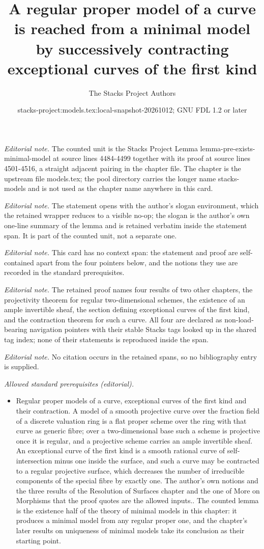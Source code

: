 \documentclass[10pt,a4paper]{amsart}
\title{A regular proper model of a curve is reached from a minimal model by successively contracting exceptional curves of the first kind}
\author{The Stacks Project Authors}
\date{stacks-project:models.tex:local-snapshot-20261012; GNU FDL 1.2 or later}
\theoremstyle{plain}
\theoremstyle{definition}
\theoremstyle{remark}
\numberwithin{equation}{subsection}
\begin{document}
\maketitle
\noindent\textit{Editorial note.} The counted unit is the Stacks Project Lemma lemma-pre-exists-minimal-model at source lines 4484-4499 together with its proof at source lines 4501-4516, a straight adjacent pairing in the chapter file. The chapter is the upstream file models.tex; the pool directory carries the longer name stacks-models and is not used as the chapter name anywhere in this card.\par\medskip
\noindent\textit{Editorial note.} The statement opens with the author's slogan environment, which the retained wrapper reduces to a visible no-op; the slogan is the author's own one-line summary of the lemma and is retained verbatim inside the statement span. It is part of the counted unit, not a separate one.\par\medskip
\noindent\textit{Editorial note.} This card has no context span: the statement and proof are self-contained apart from the four pointers below, and the notions they use are recorded in the standard prerequisites.\par\medskip
\noindent\textit{Editorial note.} The retained proof names four results of two other chapters, the projectivity theorem for regular two-dimensional schemes, the existence of an ample invertible sheaf, the section defining exceptional curves of the first kind, and the contraction theorem for such a curve. All four are declared as non-load-bearing navigation pointers with their stable Stacks tags looked up in the shared tag index; none of their statements is reproduced inside the span.\par\medskip
\noindent\textit{Editorial note.} No citation occurs in the retained spans, so no bibliography entry is supplied.\par\medskip
\noindent\textit{Allowed standard prerequisites (editorial).}\begin{itemize}
\item Regular proper models of a curve, exceptional curves of the first kind and their contraction. A model of a smooth projective curve over the fraction field of a discrete valuation ring is a flat proper scheme over the ring with that curve as generic fibre; over a two-dimensional base such a scheme is projective once it is regular, and a projective scheme carries an ample invertible sheaf. An exceptional curve of the first kind is a smooth rational curve of self-intersection minus one inside the surface, and such a curve may be contracted to a regular projective surface, which decreases the number of irreducible components of the special fibre by exactly one. The author's own notions and the three results of the Resolution of Surfaces chapter and the one of More on Morphisms that the proof quotes are the allowed inputs.. The counted lemma is the existence half of the theory of minimal models in this chapter: it produces a minimal model from any regular proper one, and the chapter's later results on uniqueness of minimal models take its conclusion as their starting point.
\end{itemize}\medskip
\end{document}
